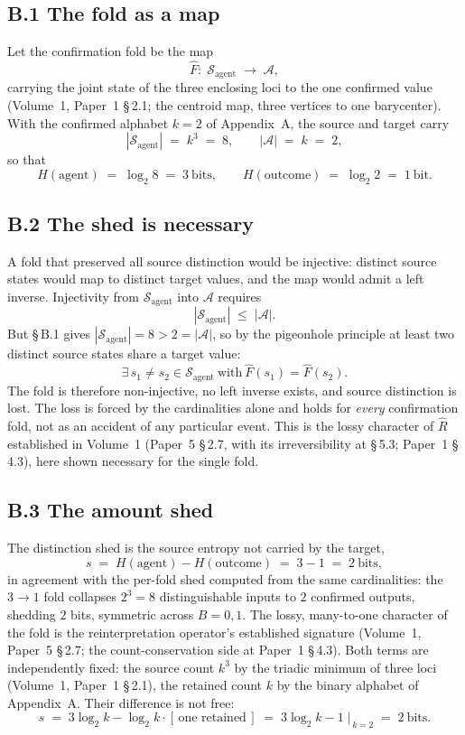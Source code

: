 \documentclass[11pt,oneside]{report}
\theoremstyle{definition}
\theoremstyle{remark}
\begin{document}
\subsection*{B.1 The fold as a map}
Let the confirmation fold be the map
\[
  \hat{F}: \; \mathcal{S}_{\text{agent}} \;\longrightarrow\; \mathcal{A},
\]
carrying the joint state of the three enclosing loci to the one confirmed value (Volume~1, Paper~1
\S\,2.1; the centroid map, three vertices to one barycenter). With the confirmed alphabet
\ensuremath{k = 2} of Appendix~A, the source and target carry
\[
  |\mathcal{S}_{\text{agent}}| \;=\; k^{3} \;=\; 8, \qquad |\mathcal{A}| \;=\; k \;=\; 2,
\]
so that
\[
  H(\text{agent}) \;=\; \log_2 8 \;=\; 3 \ \text{bits}, \qquad
  H(\text{outcome}) \;=\; \log_2 2 \;=\; 1 \ \text{bit}.
\]

\subsection*{B.2 The shed is necessary}
A fold that preserved all source distinction would be injective: distinct source states would map
to distinct target values, and the map would admit a left inverse. Injectivity from
\ensuremath{\mathcal{S}_{\text{agent}}} into \ensuremath{\mathcal{A}} requires
\[
  |\mathcal{S}_{\text{agent}}| \;\leq\; |\mathcal{A}|.
\]
But \S\,B.1 gives \ensuremath{|\mathcal{S}_{\text{agent}}| = 8 > 2 = |\mathcal{A}|}, so by the
pigeonhole principle at least two distinct source states share a target value:
\[
  \exists\, s_1 \neq s_2 \in \mathcal{S}_{\text{agent}} \ \text{with}\ \hat{F}(s_1) = \hat{F}(s_2).
\]
The fold is therefore non-injective, no left inverse exists, and source distinction is lost. The
loss is forced by the cardinalities alone and holds for \emph{every} confirmation fold, not as an
accident of any particular event. This is the lossy character of \ensuremath{\hat{R}} established in
Volume~1 (Paper~5 \S\,2.7, with its irreversibility at \S\,5.3; Paper~1 \S\,4.3), here shown
necessary for the single fold.

\subsection*{B.3 The amount shed}
The distinction shed is the source entropy not carried by the target,
\[
  s \;=\; H(\text{agent}) - H(\text{outcome}) \;=\; 3 - 1 \;=\; 2 \ \text{bits},
\]
in agreement with the per-fold shed computed from the same cardinalities: the \ensuremath{3 \to 1}
fold collapses \ensuremath{2^{3} = 8} distinguishable inputs to \ensuremath{2}
confirmed outputs, shedding \ensuremath{2} bits, symmetric across \ensuremath{B = 0, 1}. The lossy,
many-to-one character of the fold is the reinterpretation operator's established signature
(Volume~1, Paper~5 \S\,2.7; the count-conservation side at Paper~1 \S\,4.3). Both terms are
independently fixed: the source
count \ensuremath{k^{3}} by the triadic minimum of three loci (Volume~1, Paper~1 \S\,2.1), the
retained count \ensuremath{k} by the binary alphabet of Appendix~A. Their difference is not free:
\[
  s \;=\; 3\log_2 k - \log_2 k \cdot [\,\text{one retained}\,]
    \;=\; 3\log_2 k - 1 \;\Big|_{\,k=2} \;=\; 2 \ \text{bits}.
\]
\end{document}
